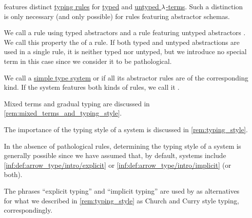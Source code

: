 \begin{definition}\label{def:simple_type_system_style}\mimprovised
   features distinct \hyperref[def:simple_typing_rule]{typing rules} for \hyperref[def:typed_lambda_term]{typed} and \hyperref[def:lambda_term]{untyped \( {\mathrm \lambda} \)-terms}. Such a distinction is only necessary (and only possible) for rules featuring abstractor schemas.

  We call a rule using typed abstractors  and a rule featuring untyped abstractors . We call this property the  of a rule. If both typed and untyped abstractions are used in a single rule, it is neither typed nor untyped, but we introduce no special term in this case since we consider it to be pathological.

  We call a \hyperref[def:simple_type_system]{simple type system}  or  if all its abstractor rules are of the corresponding kind. If the system features both kinds of rules, we call it .
\end{definition}
\begin{comments}
  \item Mixed terms and gradual typing are discussed in \cref{rem:mixed_terms_and_typing_style}.

  \item The importance of the typing style of a system is discussed in \cref{rem:typing_style}.

  \item In the absence of pathological rules, determining the typing style of a system is generally possible since we have assumed that, by default, systems include \ref{inf:def:arrow_type/intro/explicit} or \ref{inf:def:arrow_type/intro/implicit} (or both).

  \item The phrases \enquote{explicit typing} and \enquote{implicit typing} are used by  as alternatives for what we described in \cref{rem:typing_style} as Church and Curry style typing, correspondingly.
\end{comments}

